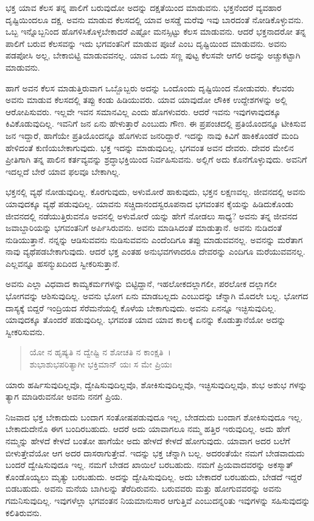 ಭಕ್ತ ಯಾವ ಕೆಲಸ ತನ್ನ ಪಾಲಿಗೆ ಬರುವುದೋ ಅದನ್ನು ದಕ್ಷತೆಯಿಂದ ಮಾಡುವನು. ಭಕ್ತನೆಂದರೆ ವ್ಯವಹಾರ ದೃಷ್ಟಿಯಿಂದಲೂ ದಕ್ಷ. ಅವನು ಮಾಡುವ ಕೆಲಸದಲ್ಲಿ ಯಾವ ಅಸಡ್ಡೆ ಮರೆವು ಇವು ಬಾರದಂತೆ ನೋಡಿಕೊಳ್ಳುವನು. ಒಬ್ಬ ಇನ್ನೊಬ್ಬನಿಂದ ಹೊಗಳಿಸಿಕೊಳ್ಳಬೇಕಾದರೆ ಎಷ್ಟೋ ಮನಸ್ಸಿಟ್ಟು ಕೆಲಸ ಮಾಡುವನು. ಆದರೆ ಭಕ್ತನಾದರೋ ತನ್ನ ಪಾಲಿಗೆ ಬರುವ ಕೆಲಸವನ್ನು ಇದು ಭಗವಂತನಿಗೆ ಮಾಡುವ ಪೂಜೆ ಎಂಬ ದೃಷ್ಟಿಯಿಂದ ಮಾಡುವನು. ಅವನು ಪಡಪೋಸಿ ಅಲ್ಲ, ಬೇಕಾಬಿಟ್ಟಿ ಮಾಡುವವನಲ್ಲ. ಯಾವ ಒಂದು ಸಣ್ಣ ಪುಟ್ಟ ಕೆಲಸವೇ ಆಗಲಿ ಅದನ್ನು ಅಚ್ಚುಕಟ್ಟಾಗಿ ಮಾಡುವನು.

ಹಾಗೆ ಅವನ ಕೆಲಸ ಮಾಡುತ್ತಿರುವಾಗ ಒಬ್ಬೊಬ್ಬರು ಅದನ್ನು ಒಂದೊಂದು ದೃಷ್ಟಿಯಿಂದ ನೋಡುವರು. ಕೆಲವರು ಅವನು ಮಾಡುವ ಕೆಲಸದಲ್ಲಿ ತಪ್ಪು ಕಂಡು ಹಿಡಿಯುವರು. ಯಾವ ಯಾವುದೋ ಲೌಕಿಕ ಉದ್ದೇಶಗಳನ್ನು ಅಲ್ಲಿ ಆರೋಪಿಸುವರು. ಇಲ್ಲವೇ ಇವನ ಸಮಾನವಿಲ್ಲ ಎಂದು ಹೊಗಳುವರು. ಆದರೆ ಇವನು ಇವುಗಳಾವುದಕ್ಕೂ ಕಿವಿಕೊಡುವುದಿಲ್ಲ. ಇವನಿಗೆ ಜನ ಏನು ಹೇಳುತ್ತಾರೆ ಎಂಬುದು ಗೌಣ. ಈ ಪ್ರಪಂಚದಲ್ಲಿ ಪ್ರತಿಯೊಂದನ್ನೂ ಟೀಕಿಸುವ ಜನ ಇದ್ದಾರೆ, ಹಾಗೆಯೇ ಪ್ರತಿಯೊಂದನ್ನೂ ಹೊಗಳುವ ಜನರಿದ್ದಾರೆ. ಇದನ್ನು ನಾವು ಕಿವಿಗೆ ಹಾಕಿಕೊಂಡರೆ ಮಂದಿ ಹೇಳಿದಂತೆ ಕುಣಿಯಬೇಕಾಗುವುದು. ಭಕ್ತ ಇದನ್ನು ಮಾಡುವುದಿಲ್ಲ. ಭಗವಂತ ಅವನ ದೇವರು. ದೇವರ ಮೇಲಿನ ಪ್ರೀತಿಗಾಗಿ ತನ್ನ ಪಾಲಿನ ಕರ್ತವ್ಯವನ್ನು ಶ್ರದ್ಧಾಭಕ್ತಿಯಿಂದ ನಿರ್ವಹಿಸುವನು. ಅಲ್ಲಿಗೆ ಅದು ಕೊನೆಗೊಳ್ಳುವುದು. ಅವನಿಗೆ ಇದಲ್ಲದೆ ಬೇರೆ ಯಾವ ಫಲವೂ ಬೇಕಾಗಿಲ್ಲ. 

ಭಕ್ತನಲ್ಲಿ ವ್ಯಥೆ ನೋಡುವುದಿಲ್ಲ. ಕೊರಗುವುದು, ಅಳುಮೋರೆ ಹಾಕುವುದು, ಭಕ್ತನ ಲಕ್ಷಣವಲ್ಲ. ಜೀವನದಲ್ಲಿ ಅವನು ಯಾವುದಕ್ಕೂ ವ್ಯಥೆ ಪಡುವುದಿಲ್ಲ. ಯಾವನು ಸಚ್ಚಿದಾನಂದಸ್ವರೂಪನಾದ ಭಗವಂತನ ಕೈಯನ್ನು ಹಿಡಿದುಕೊಂಡು ಜೀವನದಲ್ಲಿ ನಡೆಯುತ್ತಿರುವನೊ ಅವನಲ್ಲಿ ಅಳುಮೋರೆ ಯನ್ನು ಹೇಗೆ ನೋಡಲು ಸಾಧ್ಯ? ಅವನು ತನ್ನ ಜೀವನದ ಜವಾಬ್ದಾರಿಯನ್ನು ಭಗವಂತನಿಗೆ ಅರ್ಪಿಸಿರುವನು. ಅವನು ಮಾಡಿಸಿದಂತೆ ಮಾಡುತ್ತಾನೆ. ಅವನು ನುಡಿದಂತೆ ನುಡಿಯುತ್ತಾನೆ. ನನ್ನನ್ನು ಆಡಿಸುವವನು ನುಡಿಸುವವನು ಎಂದೆಂದಿಗೂ ತಪ್ಪು ಮಾಡುವವನಲ್ಲ. ಅವನನ್ನು ಮರೆತಾಗ ನಾವು ವ್ಯಥೆಪಡಬೇಕಾಗುವುದು. ಆದರೆ ಭಕ್ತ ಎಂತಹ ಅನುಭವಗಳಾದರೂ ದೇವರನ್ನು ಎಂದಿಗೂ ಮರೆಯುವವನಲ್ಲ. ಎಲ್ಲವನ್ನೂ ಹಸನ್ಮುಖದಿಂದ ಸ್ವೀಕರಿಸುತ್ತಾನೆ.

ಅವನು ಎಲ್ಲಾ ವಿಧವಾದ ಕಾಮ್ಯಕರ್ಮಗಳನ್ನು ಬಿಟ್ಟಿದ್ದಾನೆ, ಇಹಲೋಕದಲ್ಲಾಗಲೀ, ಪರಲೋಕ ದಲ್ಲಾಗಲೀ ಭೋಗವನ್ನು ಆಶಿಸುವುದಿಲ್ಲ. ಅವನು ಭೋಗ ಏನು ಮಾಡಬಲ್ಲದು ಎಂಬುದನ್ನು ಚೆನ್ನಾಗಿ ಮೊದಲೇ ಬಲ್ಲ. ಭೋಗದ ದಾಸ್ಯಕ್ಕೆ ಬಿದ್ದರೆ ಇಂದ್ರಿಯದ ಸೆರೆಮನೆಯಲ್ಲಿ ಕೊಳೆಯ ಬೇಕಾಗುವುದು. ಅವನು ಏನನ್ನೂ ಇಚ್ಛಿಸುವುದಿಲ್ಲ. ಯಾವುದಕ್ಕೂ ತೊಂದರೆ ಪಡುವುದಿಲ್ಲ. ಭಗವಂತ ಯಾವ ಯಾವ ಕಾಲಕ್ಕೆ ಏನನ್ನು ಕೊಡುತ್ತಾನೆಯೋ ಅದನ್ನು ಸ್ವೀಕರಿಸುವನು.

\begin{verse}
ಯೋ ನ ಹೃಷ್ಯತಿ ನ ದ್ವೇಷ್ಟಿ ನ ಶೋಚತಿ ನ ಕಾಂಕ್ಷತಿ~।\\ಶುಭಾಶುಭಪರಿತ್ಯಾಗೀ ಭಕ್ತಿಮಾನ್ ಯಃ ಸ ಮೇ ಪ್ರಿಯಃ 
\end{verse}

{\small ಯಾರು ಹರ್ಷಿಸುವುದಿಲ್ಲವೊ, ದ್ವೇಷಿಸುವುದಿಲ್ಲವೊ, ಶೋಕಿಸುವುದಿಲ್ಲವೊ, ಇಚ್ಛಿಸುವುದಿಲ್ಲವೊ, ಶುಭ ಅಶುಭ ಗಳನ್ನು ತ್ಯಾಗ ಮಾಡಿರುವನೋ ಅವನು ನನಗೆ ಪ್ರಿಯ.}

ನಿಜವಾದ ಭಕ್ತ ಬೇಕಾದುದು ಬಂದಾಗ ಸಂತೋಷಪಡುವುದೂ ಇಲ್ಲ, ಬೇಡದುದು ಬಂದಾಗ ಶೋಕಿಸುವುದೂ ಇಲ್ಲ. ಬೇಕಾದುದೇನೊ ಈಗ ಬಂದಿರಬಹುದು. ಆದರೆ ಅದು ಯಾವಾಗಲೂ ನಮ್ಮ ಹತ್ತಿರ ಇರುವುದಿಲ್ಲ. ಅದು ಹೇಗೆ ನಮ್ಮನ್ನು ಹೇಳದೆ ಕೇಳದೆ ಬಂತೋ ಹಾಗೆಯೇ ಅದು ಹೇಳದೆ ಕೇಳದೆ ಹೋಗುವುದು. ಯಾವಾಗ ಅದರ ಬಲೆಗೆ ಬೀಳುತ್ತೇವೆಯೋ ಆಗ ಅದರ ದಾಸರಾಗುತ್ತೇವೆ. ಇದನ್ನು ಭಕ್ತ ಚೆನ್ನಾಗಿ ಬಲ್ಲ. ಅದರಂತೆಯೇ ನಮಗೆ ಬೇಡವಾದುದು ಬಂದರೆ ದ್ವೇಷಿಸುವುದೂ ಇಲ್ಲ. ನಮಗೆ ಬೇಡದ ಖಾಯಿಲೆ ಬರಬಹುದು. ನಮಗೆ ಪ್ರಿಯವಾದವರನ್ನು ಅಕಸ್ಮಾತ್ ಕೊಂಡೊಯ್ಯಲು ಮೃತ್ಯು ಬರಬಹುದು. ಅದನ್ನು ದ್ವೇಷಿಸುವುದಿಲ್ಲ. ಅದು ಬೇಕಾದರೆ ಬರಬಹುದು, ಬೇಡದೆ ಇದ್ದರೆ ಬಿಡಬಹುದು. ಅವನು ಮನೆಯ ಬಾಗಿಲನ್ನು ತೆರೆದಿರುವನು. ಬರುವವರು ಮತ್ತು ಹೋಗುವವರನ್ನು ಅವನು ಗಮನಿಸುವುದಿಲ್ಲ. ಇವುಗಳೆಲ್ಲಾ ಭಗವಂತನ ನಿಯಮಾನುಸಾರ ಆಗುತ್ತಿವೆ ಎಂಬುದನ್ನರಿತು ಇವುಗಳನ್ನು ಸಹಿಸುವುದನ್ನು ಕಲಿತಿರುವನು.

